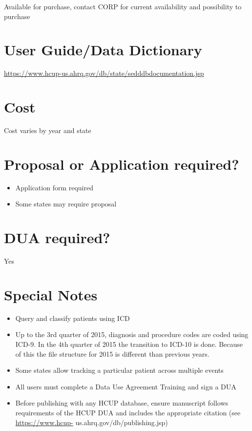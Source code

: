 \documentclass[
]{book}
\providecommand{\tightlist}{%
  \setlength{\itemsep}{0pt}\setlength{\parskip}{0pt}}
\begin{document}
Available for purchase, contact CORP for current availability and possibility to purchase

\hypertarget{user-guidedata-dictionary-83}{%
\section{User Guide/Data Dictionary}\label{user-guidedata-dictionary-83}}

\url{https://www.hcup-us.ahrq.gov/db/state/sedddbdocumentation.jsp}

\hypertarget{cost-83}{%
\section{Cost}\label{cost-83}}

Cost varies by year and state

\hypertarget{proposal-or-application-required-83}{%
\section{Proposal or Application required?}\label{proposal-or-application-required-83}}

\begin{itemize}
\tightlist
\item
  Application form required
\item
  Some states may require proposal
\end{itemize}

\hypertarget{dua-required-83}{%
\section{DUA required?}\label{dua-required-83}}

Yes

\hypertarget{special-notes-83}{%
\section{Special Notes}\label{special-notes-83}}

\begin{itemize}
\tightlist
\item
  Query and classify patients using ICD
\item
  Up to the 3rd quarter of 2015, diagnosis and procedure codes are coded using ICD-9. In the 4th quarter of 2015 the transition to ICD-10 is done. Because of this the file structure for 2015 is different than previous years.
\item
  Some states allow tracking a particular patient across multiple events
\item
  All users must complete a Data Use Agreement Training and sign a DUA
\item
  Before publishing with any HCUP database, ensure manuscript follows requirements of the HCUP DUA and includes the appropriate citation (see \url{https://www.hcup-} us.ahrq.gov/db/publishing.jsp)
\end{itemize}
\end{document}
